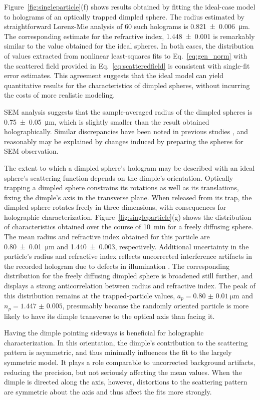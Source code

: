 Figure~\ref{fig:singleparticle}(f) shows results obtained by fitting the
ideal-case model to holograms of an optically trapped dimpled sphere.
The radius estimated by straightforward 
Lorenz-Mie analysis of \num{60} such holograms
is \SI{0.821(6)}{\um}.
The corresponding estimate for the refractive index,
\num{1.448(1)} is remarkably similar to the value obtained for the
ideal spheres.
In both cases, the distribution of
values extracted from nonlinear least-squares 
fits to Eq.~\eqref{eq:gen_norm} with the scattered field provided
in Eq.~\eqref{eq:scatteredfield} is consistent with single-fit error estimates.
This agreement suggests that the ideal model can yield quantitative
results for the characteristics of dimpled spheres, without incurring
the costs of more realistic modeling.

SEM analysis suggests that the sample-averaged radius of the
dimpled spheres is \SI{0.75(5)}{\um}, which is slightly smaller
than the result obtained holographically.
Similar discrepancies have been noted in previous studies
\cite{yamada85,cermola87},
and reasonably may be explained by changes
induced by preparing the spheres for SEM observation.

The extent to which a dimpled sphere's hologram may be described
with an ideal sphere's scattering function depends on the dimple's
orientation.
Optically trapping a dimpled sphere constrains its rotations 
as well as its translations, fixing the dimple's axis in the
transverse plane.
When released from its trap, the dimpled sphere rotates freely in three
dimensions, with consequences for holographic characterization.
Figure~\ref{fig:singleparticle}(g) shows the distribution of characteristics
obtained over the course of \SI{10}{\minute} for a freely diffusing
sphere.
The mean radius and refractive index obtained for this particle are
\SI{0.80(1)}{\um} and \num{1.440(3)}, respectively.
Additional uncertainty in the particle's radius and refractive index
reflects uncorrected interference artifacts in the recorded hologram due
to defects in illumination \cite{krishnatreya14}.
The corresponding distribution for the freely diffusing dimpled sphere
is broadened still further, and displays a strong anticorrelation between
radius and refractive index.
The peak of this distribution remains at the trapped-particle values,
$a_p = \SI{0.80(1)}{\um}$ and $n_p = \num{1.447(5)}$,
presumably because the randomly oriented particle is more likely 
to have its dimple transverse to the optical axis than facing it.

Having the dimple pointing sideways is beneficial for holographic
characterization.  In this orientation, the dimple's contribution to the 
scattering pattern is asymmetric, and thus minimally influences the
fit to the largely symmetric model.  It plays a role comparable to
uncorrected background artifacts, reducing the precision, but not
seriously affecting the mean values.
When the dimple is directed along the axis, however, distortions to
the scattering pattern are symmetric about the axis and thus affect
the fits more strongly.


